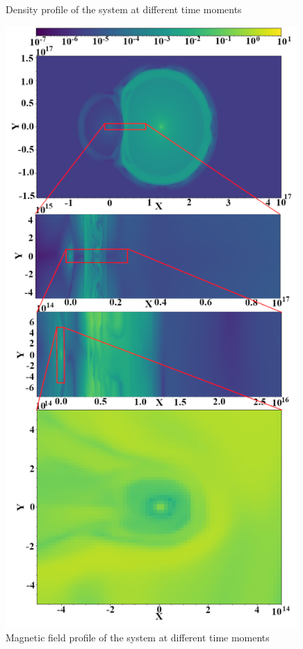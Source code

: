 \documentclass{article}
\begin{document}
\begin{figure}
\begin{minipage}{0.49\textwidth}
			\caption{Density profile of the system at different time moments}
			\label{density}
		\end{minipage}\hfill
		\begin{minipage}{0.49\textwidth}
			\centering
			\includegraphics[width=0.99\textwidth]{./fig/Bfield.png} 
			\caption{Magnetic field profile of the system at different time moments}
			\label{Bfield}
		\end{minipage}
	\end{figure}
	
\end{document}
